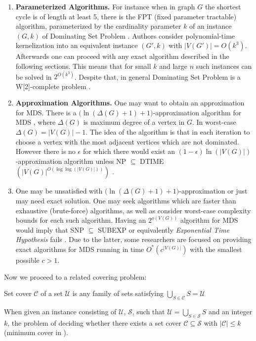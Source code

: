 \begin{enumerate}
    \item \textbf{Parameterized Algorithms.} For instance when in graph $G$ the shortest cycle is of length at least 5, there is the FPT (fixed parameter tractable) algorithm, parameterized by the cardinality parameter $k$ of an instance $(G, k)$ of Dominating Set Problem \cite{cygan2015parameterized}. Authors consider polynomial-time kernelization into an equivalent instance $(G', k)$ with $|V(G')| = O(k^3)$. Afterwards one can proceed with any exact algorithm described in the following sections. This means that for small $k$ and large $n$ such instances can be solved in $2^{O(k^3)}$. Despite that, in general Dominating Set Problem is a W[2]-complete problem \cite{downey1992fixed}.
    \item \textbf{Approximation Algorithms.} One may want to obtain an approximation for MDS. There is a $\big(\ln(\Delta(G) + 1) + 1\big)$-approximation algorithm for MDS \cite{KLASING200475}, where $\Delta(G)$ is maximum degree of a vertex in $G$. In worst-case $\Delta(G) = |V(G)| - 1$. The idea of the algorithm is that in each iteration to choose a vertex with the most adjacent vertices which are not dominated. However there is no $\epsilon$ for which there would exist an  $(1-\epsilon)\ln(|V(G)|)$-approximation algorithm unless NP $\subseteq$ DTIME$(|V(G)|^{O(\log \log(|V(G)|))})$ \cite{KLASING200475}.
    \item One may be unsatisfied with $\big(\ln(\Delta(G) + 1) + 1\big)$-approximation or just may need exact solution. One may seek algorithms which are faster than exhaustive (brute-force) algorithms, as well as consider worst-case complexity bounds for each such algorithm. Having an $2^{o(V(G))}$ algorithm for MDS would imply that SNP $\subseteq$ SUBEXP \cite{FominKratschWoeginger10.1007/978-3-540-30559-0_21} or equivalently \textit{Exponential Time Hypothesis} fails \cite{Impagliazzo10.1006/jcss.2000.1727}. Due to the latter, some researchers are focused on providing exact algorithms for MDS running in time $O^*(c^{|V(G)|})$ with the smallest possible $c > 1$.
\end{enumerate}
Now we proceed to a related covering problem:
\begin{definition}
Set cover $\mathcal{C}$ of a set $\mathcal{U}$ is any family of sets satisfying $\bigcup_{S\in \mathcal{C}} S = \mathcal{U}$
\end{definition}
\begin{definition}
When given an instance consisting of $\mathcal{U}$, $\mathcal{S}$, such that $\mathcal{U} = \bigcup_{S\in\mathcal{S}} S$ and an integer $k$, the problem of deciding whether there exists a set cover $\mathcal{C} \subseteq \mathcal{S}$ with $|\mathcal{C}| \leq k$ (minimum cover in \cite{Garey90}).
\end{definition}
